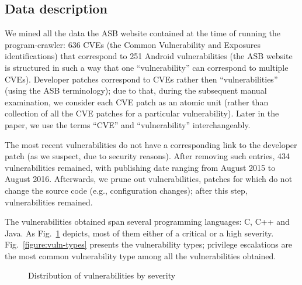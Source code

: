 \subsection{Data description}

We mined all the data the ASB website contained at the time of running the program-crawler: 636 CVEs (the Common Vulnerability and Exposures identifications) that correspond to 251 Android vulnerabilities (the ASB website is structured in such a way that one ``vulnerability'' can correspond to multiple CVEs). Developer patches correspond to CVEs rather then ``vulnerabilities'' (using the ASB terminology); due to that, during the subsequent manual examination, we consider each CVE patch as an atomic unit (rather than collection of all the CVE patches for a particular vulnerability). Later in the paper, we use the terms ``CVE'' and ``vulnerability'' interchangeably. %

The most recent vulnerabilities do not have a corresponding link to the developer patch (as we suspect, due to security reasons). After removing such entries, 434 vulnerabilities remained, with publishing date ranging from August 2015 to August 2016. Afterwards, we prune out vulnerabilities, patches for which do not change the source code (e.g., configuration changes); after this step, \numvuln vulnerabilities remained.

The vulnerabilities obtained span several programming languages: C, C++ and Java. As Fig.~\ref{figure:severity} depicts, most of them either of a critical or a high severity. Fig.~\ref{figure:vuln-types} presents the vulnerability types; privilege escalations are the most common vulnerability type among all the vulnerabilities obtained.

\begin{figure}
    \small \caption{Distribution of vulnerabilities by severity}
        \label{figure:severity}
\end{figure}

